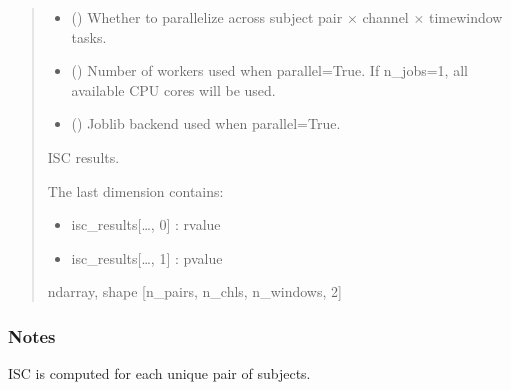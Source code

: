 \documentclass[letterpaper,10pt,english]{sphinxhowto}
\begin{document}
\begin{fulllineitems}
\begin{quote}
\begin{description}
\begin{itemize}
\item {} 
\sphinxAtStartPar
{} (\sphinxstyleliteralemphasis{\sphinxupquote{, }}) \textendash{} Whether to parallelize across subject pair × channel × time\sphinxhyphen{}window tasks.

\item {} 
\sphinxAtStartPar
{} (\sphinxstyleliteralemphasis{\sphinxupquote{, }}) \textendash{} Number of workers used when parallel=True.
If n\_jobs=\sphinxhyphen{}1, all available CPU cores will be used.

\item {} 
\sphinxAtStartPar
{} (\sphinxstyleliteralemphasis{\sphinxupquote{, }}\sphinxstyleliteralemphasis{\sphinxupquote{, }}) \textendash{} Joblib backend used when parallel=True.

\end{itemize}

\sphinxAtStartPar

\sphinxAtStartPar
{} \textendash{} ISC results.

\sphinxAtStartPar
The last dimension contains:
\begin{itemize}
\item {} 
\sphinxAtStartPar
isc\_results{[}…, 0{]} : r\sphinxhyphen{}value

\item {} 
\sphinxAtStartPar
isc\_results{[}…, 1{]} : p\sphinxhyphen{}value

\end{itemize}


\sphinxAtStartPar
ndarray, shape {[}n\_pairs, n\_chls, n\_windows, 2{]}

\end{description}\end{quote}
\subsubsection*{Notes}

\sphinxAtStartPar
ISC is computed for each unique pair of subjects.

\end{fulllineitems}
\end{document}
